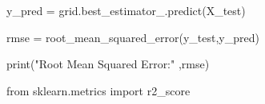 \documentclass[
  letterpaper,
  DIV=11,
  numbers=noendperiod]{scrartcl}
\newenvironment{Shaded}{\begin{snugshade}}{\end{snugshade}}
\newcommand{\BuiltInTok}[1]{\textcolor[rgb]{0.00,0.23,0.31}{#1}}
\newcommand{\ImportTok}[1]{\textcolor[rgb]{0.00,0.46,0.62}{#1}}
\newcommand{\NormalTok}[1]{\textcolor[rgb]{0.00,0.23,0.31}{#1}}
\newcommand{\OperatorTok}[1]{\textcolor[rgb]{0.37,0.37,0.37}{#1}}
\newcommand{\StringTok}[1]{\textcolor[rgb]{0.13,0.47,0.30}{#1}}
\begin{document}
\begin{Shaded}
\begin{Highlighting}[]
\NormalTok{y\_pred }\OperatorTok{=}\NormalTok{ grid.best\_estimator\_.predict(X\_test)}
\end{Highlighting}
\end{Shaded}

\begin{Shaded}
\begin{Highlighting}[]
\NormalTok{rmse }\OperatorTok{=}\NormalTok{ root\_mean\_squared\_error(y\_test,y\_pred)}
\end{Highlighting}
\end{Shaded}

\begin{Shaded}
\begin{Highlighting}[]
\BuiltInTok{print}\NormalTok{(}\StringTok{"Root Mean Squared Error:"}\NormalTok{ ,rmse)}
\end{Highlighting}
\end{Shaded}

\begin{Shaded}
\begin{Highlighting}[]
\ImportTok{from}\NormalTok{ sklearn.metrics }\ImportTok{import}\NormalTok{ r2\_score}
\end{Highlighting}
\end{Shaded}
\end{document}
